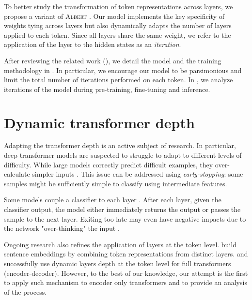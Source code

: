 To better study the transformation of token representations across layers, we propose a variant of \textsc{Albert} . Our model implements the key specificity of weights tying across layers but also dynamically adapts the number of layers applied to each token. Since all layers share the same weight, we refer to the application of the layer to the hidden states as an \textit{iteration}. 

After reviewing the related work (), we detail the model and the training methodology in . In particular, we encourage our model to be parsimonious and limit the total number of iterations performed on each token. In , we analyze iterations of the model during pre-training, fine-tuning and inference. 

\section{Dynamic transformer depth}

Adapting the transformer depth is an active subject of research. In particular, deep transformer models are suspected to struggle to adapt to different levels of difficulty. While large models correctly predict difficult examples, they over-calculate simpler inputs \parencite{liu_20}. This issue can be addressed using \textit{early-stopping}: some samples might be sufficiently simple to classify using intermediate features. 

Some models couple a classifier to each layer \parencite{zhou_20b, liu_20, xin_20}. After each layer, given the classifier output, the model either immediately returns the output or passes the sample to the next layer. 
Exiting too late may even have negative impacts due to the network "over-thinking" the input \parencite{kaya_19}. 

Ongoing research also refines the application of layers at the token level. \textcite{wang_20} build sentence embeddings by combining token representations from distinct layers. \textcite{elbayad_20} and \textcite{dehghani_19} successfully use dynamic layers depth at the token level for full transformers (encoder-decoder). However, to the best of our knowledge, our attempt is the first to apply such mechanism to encoder only transformers and to provide an analysis of the process. 


